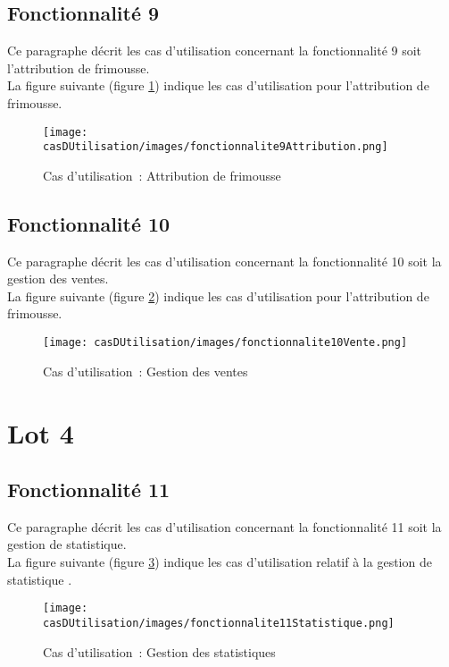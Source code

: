 \subsection{Fonctionnalité 9}
Ce paragraphe décrit les cas d'utilisation concernant la fonctionnalité 9 soit l'attribution de frimousse. \\

La figure suivante (figure \ref{diagrammeCasUtilisation9}) indique les cas d'utilisation pour l'attribution de frimousse.
\begin{figure}[H]
	\centering
	\texttt{[image: casDUtilisation/images/fonctionnalite9Attribution.png]}
	\caption{Cas d'utilisation~: Attribution de frimousse }
	\label{diagrammeCasUtilisation9}
\end{figure}

\subsection{Fonctionnalité 10}
Ce paragraphe décrit les cas d'utilisation concernant la fonctionnalité 10 soit la gestion des ventes. \\

La figure suivante (figure \ref{diagrammeCasUtilisation10}) indique les cas d'utilisation pour l'attribution de frimousse.
\begin{figure}[H]
	\centering
	\texttt{[image: casDUtilisation/images/fonctionnalite10Vente.png]}
	\caption{Cas d'utilisation~: Gestion des ventes }
	\label{diagrammeCasUtilisation10}
\end{figure}

\section{Lot 4}
\subsection{Fonctionnalité 11}
Ce paragraphe décrit les cas d'utilisation concernant la fonctionnalité 11 soit la gestion de statistique. \\

La figure suivante (figure \ref{diagrammeCasUtilisation11}) indique les cas d'utilisation relatif à la gestion de statistique .
\begin{figure}[H]
	\centering
	\texttt{[image: casDUtilisation/images/fonctionnalite11Statistique.png]}
	\caption{Cas d'utilisation~: Gestion des statistiques }
	\label{diagrammeCasUtilisation11}
\end{figure}
